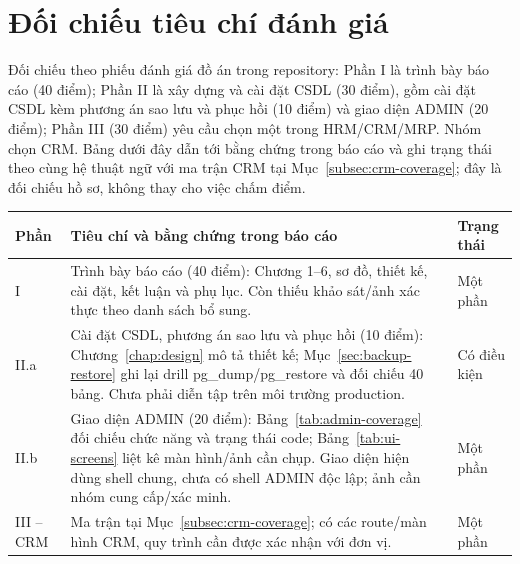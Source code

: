 \section{Đối chiếu tiêu chí đánh giá}
Đối chiếu theo phiếu đánh giá đồ án trong repository: Phần I là trình bày báo cáo (40 điểm); Phần II là xây dựng và cài đặt CSDL (30 điểm), gồm cài đặt CSDL kèm phương án sao lưu và phục hồi (10 điểm) và giao diện ADMIN (20 điểm); Phần III (30 điểm) yêu cầu chọn một trong HRM/CRM/MRP. Nhóm chọn CRM. Bảng dưới đây dẫn tới bằng chứng trong báo cáo và ghi trạng thái theo cùng hệ thuật ngữ với ma trận CRM tại Mục~\ref{subsec:crm-coverage}; đây là đối chiếu hồ sơ, không thay cho việc chấm điểm.
\small
\begin{longtable}{|p{}|p{}|p{}|}\hline
\textbf{Phần}&\textbf{Tiêu chí và bằng chứng trong báo cáo}&\textbf{Trạng thái}\\
\hline\endhead
I&Trình bày báo cáo (40 điểm): Chương 1–6, sơ đồ, thiết kế, cài đặt, kết luận và phụ lục. Còn thiếu khảo sát/ảnh xác thực theo danh sách bổ sung.&Một phần\\
\hline
II.a&Cài đặt CSDL, phương án sao lưu và phục hồi (10 điểm): Chương~\ref{chap:design} mô tả thiết kế; Mục~\ref{sec:backup-restore} ghi lại drill pg\_dump/pg\_restore và đối chiếu 40 bảng. Chưa phải diễn tập trên môi trường production.&Có điều kiện\\
\hline
II.b&Giao diện ADMIN (20 điểm): Bảng~\ref{tab:admin-coverage} đối chiếu chức năng và trạng thái code; Bảng~\ref{tab:ui-screens} liệt kê màn hình/ảnh cần chụp. Giao diện hiện dùng shell chung, chưa có shell ADMIN độc lập; ảnh cần nhóm cung cấp/xác minh.&Một phần\\
\hline
III – CRM&Ma trận tại Mục~\ref{subsec:crm-coverage}; có các route/màn hình CRM, quy trình cần được xác nhận với đơn vị.&Một phần\\
\hline
\end{longtable}
\normalsize
